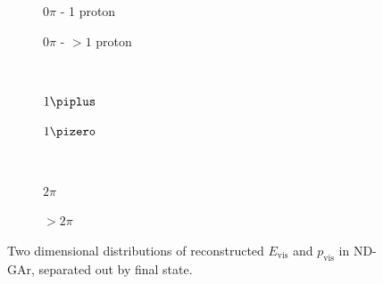 \begin{figure}[t]
	\begin{subfigure}[t]{.5\linewidth}
		\begin{adjustbox}{max totalsize=\linewidth, center}
			
		\end{adjustbox}
		\caption{$0\pi$ - 1 proton}
	\end{subfigure}
	\hfill
	\begin{subfigure}[t]{.5\linewidth}
		\begin{adjustbox}{max totalsize=\linewidth, center}
			
		\end{adjustbox}
		\caption{$0\pi$ - $>1$ proton}
	\end{subfigure} \\
	\begin{subfigure}[t]{.5\linewidth}
		\begin{adjustbox}{max totalsize=\linewidth, center}
			
		\end{adjustbox}
		\caption{$1\piplus$}
	\end{subfigure}
	\hfill
	\begin{subfigure}[t]{.5\linewidth}
		\begin{adjustbox}{max totalsize=\linewidth, center}
			
		\end{adjustbox}
		\caption{$1\pizero$}
	\end{subfigure} \\
	\begin{subfigure}[t]{.5\linewidth}
		\begin{adjustbox}{max totalsize=\linewidth, center}
			
		\end{adjustbox}
		\caption{$2\pi$}
	\end{subfigure}
	\hfill
	\begin{subfigure}[t]{.5\linewidth}
		\begin{adjustbox}{max totalsize=\linewidth, center}
			
		\end{adjustbox}
		\caption{$>2\pi$}
	\end{subfigure}
	\caption[Two dimensional distributions of $E_{\text{vis}}$ and $p_{\text{vis}}$ in ND-GAr]{Two dimensional distributions of reconstructed $E_{\text{vis}}$ and $p_{\text{vis}}$ in ND-GAr, separated out by final state.}
	\label{fig:q0q3Genie}
\end{figure}


